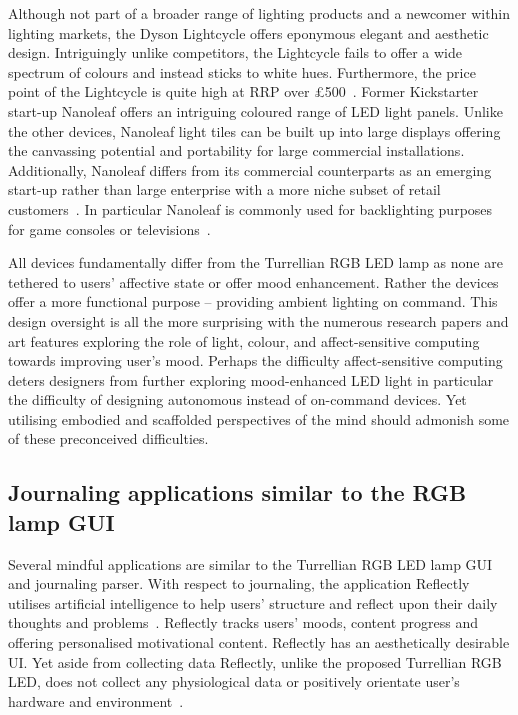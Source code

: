 \documentclass{sigchi}
\begin{document}
Although not part of a broader range of lighting products and a newcomer within lighting markets, the Dyson Lightcycle offers eponymous elegant and aesthetic design. Intriguingly unlike competitors, the Lightcycle fails to offer a wide spectrum of colours and instead sticks to white hues. Furthermore, the price point of the Lightcycle is quite high at RRP over £500~\cite{Dyson01}. Former Kickstarter start-up Nanoleaf offers an intriguing coloured range of LED light panels. Unlike the other devices, Nanoleaf light tiles can be built up into large displays offering the canvassing potential and portability for large commercial installations. Additionally, Nanoleaf differs from its commercial counterparts as an emerging start-up rather than large enterprise with a more niche subset of retail customers~\cite{Nanoleaf01}. In particular Nanoleaf is commonly used for backlighting purposes for game consoles or televisions~\cite{Nanoleaf01}.

All devices fundamentally differ from the Turrellian RGB LED lamp as none are tethered to users’ affective state or offer mood enhancement. Rather the devices offer a more functional purpose – providing ambient lighting on command. This design oversight is all the more surprising with the numerous research papers and art features exploring the role of light, colour, and affect-sensitive computing towards improving user’s mood. Perhaps the difficulty affect-sensitive computing deters designers from further exploring mood-enhanced LED light in particular the difficulty of designing autonomous instead of on-command devices. Yet utilising embodied and scaffolded perspectives of the mind should admonish some of these preconceived difficulties. 

\subsection{Journaling applications similar to the RGB lamp GUI}

Several mindful applications are similar to the Turrellian RGB LED lamp GUI and journaling parser. With respect to journaling, the application Reflectly utilises artificial intelligence to help users’ structure and reflect upon their daily thoughts and problems~\cite{Reflectly01}. Reflectly tracks users’ moods, content progress and offering personalised motivational content. Reflectly has an aesthetically desirable UI. Yet aside from collecting data Reflectly, unlike the proposed Turrellian RGB LED, does not collect any physiological data or positively orientate user’s hardware and environment~\cite{Reflectly01}.
\end{document}
